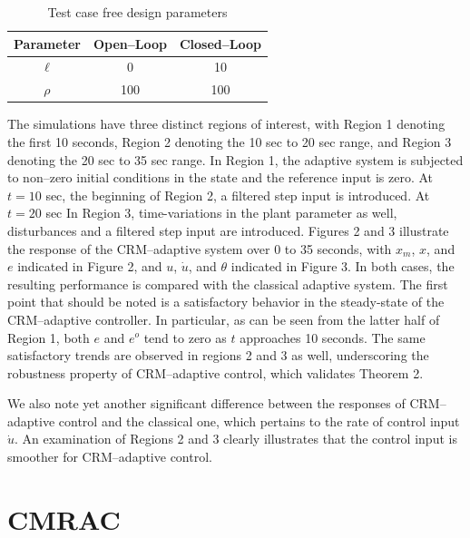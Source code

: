 \documentclass[10pt,journal]{IEEEtran}
\theoremstyle{plain}%
\theoremstyle{definition}
\begin{document}
\begin{table}[h!]
\caption{Test case free design parameters} \label{t:scen}
\centering
\begin{tabular}{ c c c}
Parameter & Open--Loop & Closed--Loop  \\ \hline
 $\ell$ & 0 & 10 \\
   $\rho$  & 100 & 100 \\ \hline
\end{tabular}  
\end{table}

The simulations have three distinct regions of interest, with Region 1 denoting the first 10 seconds, Region 2 denoting the 10 sec to 20 sec range, and Region 3 denoting the 20 sec to 35 sec range. In Region 1, the adaptive system is subjected to non--zero initial conditions in the state and the reference input is zero. At $t=10$ sec, the beginning of Region 2, a filtered step input is introduced. At $t=20$ sec In Region 3, time-variations in the plant parameter as well, disturbances and a filtered step input are introduced. Figures 2 and 3 illustrate the response of the CRM--adaptive system over 0 to 35 seconds, with $x_m$, $x$, and $e$ indicated in Figure 2, and $u$, $\dot u$, and $\theta$ indicated in Figure 3. In both cases, the resulting performance is compared with the classical adaptive system. The first point that should be noted is a satisfactory behavior in the steady-state of the CRM--adaptive controller. In particular, as can be seen from the latter half of Region 1, both $e$ and $e^o$ tend to zero as $t$ approaches 10 seconds. The same satisfactory trends are observed in regions 2 and 3 as well, underscoring the robustness property of CRM--adaptive control, which validates Theorem 2.
 
We also note yet another significant difference between the responses of CRM--adaptive control and the classical one, which pertains to the rate of control input $\dot u$. An examination of Regions 2 and 3 clearly illustrates that the control input is smoother for CRM--adaptive control.

\section{CMRAC}
\end{document}
